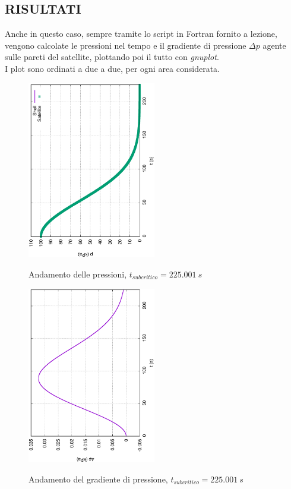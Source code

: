 \documentclass{article}
\begin{document}
        \subsection{RISULTATI\label{Esercizio2_risultati}}
        Anche in questo caso, sempre tramite lo script in Fortran fornito a lezione, 
        vengono calcolate le pressioni nel tempo e il gradiente di pressione $\Delta p$ agente sulle pareti
        del satellite, plottando poi il tutto con \textit{gnuplot}.\\ 
        I plot sono ordinati a due a due, per ogni area considerata.
        
        \begin{figure}[h!]
            \centering
            \includegraphics[width=0.5\textwidth, angle=-90]{MUL2/Esercitazione1/2A/p.eps}
            \label{fig:press_10_5}
            \caption{Andamento delle pressioni, $t_{subcritico} = 225.001  \ s$} 
        \end{figure}

        \begin{figure}[h!]
            \centering
            \includegraphics[width=0.5\textwidth, angle=-90]{MUL2/Esercitazione1/2A/Dp.eps}
            \label{fig:grad_press_10_5}
            \caption{Andamento del gradiente di pressione, $t_{subcritico} = 225.001  \ s$}
        \end{figure}
\end{document}
